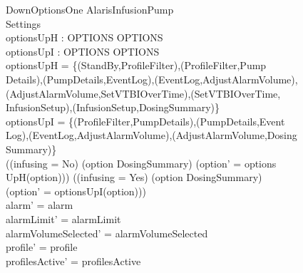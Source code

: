 \begin{schema}{DownOptionsOne}
	\Delta AlarisInfusionPump\\
	 Settings\\
	optionsUpH : OPTIONS \rel OPTIONS\\
	optionsUpI : OPTIONS \rel OPTIONS\\
	\where
	optionsUpH = \{(StandBy,ProfileFilter),(ProfileFilter,Pump\\
	Details),(PumpDetails,EventLog),(EventLog,AdjustAlarmVolume),\\
	(AdjustAlarmVolume,SetVTBIOverTime),(SetVTBIOverTime,\\
	\pagebreak
	InfusionSetup),(InfusionSetup,DosingSummary)\}\\
	optionsUpI = \{(ProfileFilter,PumpDetails),(PumpDetails,Event\\
	Log),(EventLog,AdjustAlarmVolume),(AdjustAlarmVolume,Dosing\\
	Summary)\}\\
	((infusing = No) \land (option \neq DosingSummary) \land (option' = options\\
	UpH(option))) \lor ((infusing = Yes) \land (option \neq DosingSummary) \land \\
	(option' = optionsUpI(option)))\\
	alarm' = alarm\\
	alarmLimit' = alarmLimit\\
	alarmVolumeSelected' = alarmVolumeSelected\\
	profile' = profile\\
	profilesActive' = profilesActive\\  
	  

\end{schema}
